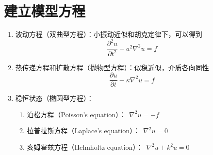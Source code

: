 \documentclass[12pt,a4paper]{article}
\renewcommand*{\vec}[1]{\bm{#1}}%
\renewcommand{\[}{\ $\displaystyle}
\renewcommand{\]}{$\ }%
\newcommand{\pard}[2]{\ensuremath{\frac{\partial #1}{\partial #2}}}
\newcommand{\pardsq}[2]{\ensuremath{\frac{\partial^2 #1}{\partial #2^2}}}
\begin{document}
\section{建立模型方程}
	\begin{enumerate}
	 \item 波动方程（双曲型方程）：小振动近似和胡克定律下，可以得到
	 $$
	   \pardsq{u}{t} - a^2\nabla^2u = f
	 $$
	 \item 热传递方程和扩散方程（抛物型方程）：似稳近似，介质各向同性
	 $$
	   \pard{u}{t} - \kappa \nabla^2 u = f
	 $$
	 \item 稳恒状态（椭圆型方程）：
	 \begin{enumerate}
	  \item 泊松方程（Poisson's equation）：\[\nabla^2u = -f\]
	  \item 拉普拉斯方程（Laplace's equation）：\[\nabla^2u = 0\]
	  \item 亥姆霍兹方程（Helmholtz equation）：\[\nabla^2u + k^2u = 0\]
	 \end{enumerate}
	\end{enumerate}
%  
\end{document}
